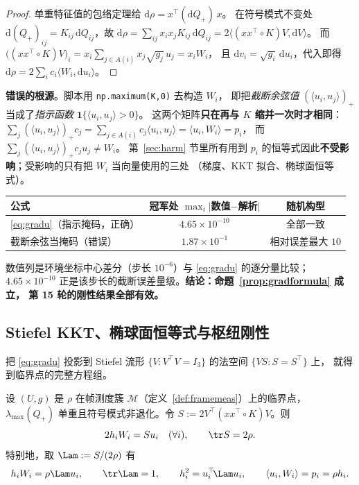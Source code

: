 \begin{proof}
单重特征值的包络定理给 $\mathrm d\rho=x^\top(\mathrm dQ_+)\,x$。
在符号模式不变处 $\mathrm d(Q_+)_{ij}=K_{ij}\,\mathrm dQ_{ij}$，故
$\mathrm d\rho=\sum_{ij}x_ix_jK_{ij}\,\mathrm dQ_{ij}=2\bigl\langle (xx^\top\!\circ K)V,\mathrm dV\bigr\rangle$。
而 $\bigl((xx^\top\!\circ K)V\bigr)_i=x_i\sum_{j\in A(i)}x_j\sqrt{g_j}\,u_j=x_iW_i$，
且 $\mathrm dv_i=\sqrt{g_i}\,\mathrm du_i$，代入即得 $\mathrm d\rho=2\sum_ic_i\langle W_i,\mathrm du_i\rangle$。
\end{proof}

\textbf{错误的根源}。脚本用 \texttt{np.maximum(K,0)} 去构造 $W_i$，
即把\emph{截断余弦值} $(\langle u_i,u_j\rangle)_+$ 当成了\emph{指示函数} $\mathbf 1\{\langle u_i,u_j\rangle>0\}$。
这两个矩阵\textbf{只在再与 $K$ 缩并一次时才相同}：
$\sum_j(\langle u_i,u_j\rangle)_+c_j=\sum_{j\in A(i)}c_j\langle u_i,u_j\rangle=\langle u_i,W_i\rangle=p_i$，
而 $\sum_j(\langle u_i,u_j\rangle)_+c_ju_j\ne W_i$。
第~\ref{sec:harm} 节里所有用到 $p_i$ 的恒等式因此\textbf{不受影响}；受影响的只有把 $W_i$ 当向量使用的三处
（梯度、KKT 拟合、椭球面恒等式）。

\begin{center}\small
\begin{tabular}{lcc}
\hline
公式 & 冠军处 $\max_i\lvert$数值$-$解析$\rvert$ & 随机构型 \\
\hline
\eqref{eq:gradu}（指示掩码，正确） & $4.65\times10^{-10}$ & 全部一致 \\
截断余弦当掩码（错误） & $1.87\times10^{-1}$ & 相对误差最大 $10$ \\
\hline
\end{tabular}
\end{center}

\noindent 数值列是环境坐标中心差分（步长 $10^{-6}$）与 \eqref{eq:gradu} 的逐分量比较；
$4.65\times10^{-10}$ 正是该步长的截断误差量级。\textbf{结论：命题~\ref{prop:gradformula} 成立，
第 15 轮的刚性结果全部有效。}

\subsection{Stiefel KKT、椭球面恒等式与枢纽刚性}\label{sec:r17:kkt}

把 \eqref{eq:gradu} 投影到 Stiefel 流形 $\{V:V^\top V=I_3\}$ 的法空间 $\{VS:S=S^\top\}$ 上，
就得到临界点的完整方程组。

\begin{theorem}\label{thm:stiefelkkt}
设 $(U,g)$ 是 $\rho$ 在帧测度簇 $\mathcal M$（定义~\ref{def:framemeas}）上的临界点，
$\lambda_{\max}(Q_+)$ 单重且符号模式非退化。令 $S:=2V^\top(xx^\top\!\circ K)V$。则
\begin{equation}\label{eq:kkt}
2h_iW_i=Su_i\quad(\forall i),\qquad \tr S=2\rho .
\end{equation}
特别地，取 $\Lam:=S/(2\rho)$ 有
\begin{equation}\label{eq:trace1}
h_iW_i=\rho\Lam u_i,\qquad \tr\Lam=1,\qquad h_i^2=u_i^\top\!\Lam u_i,\qquad
\langle u_i,W_i\rangle=p_i=\rho h_i .
\end{equation}
\end{theorem}


